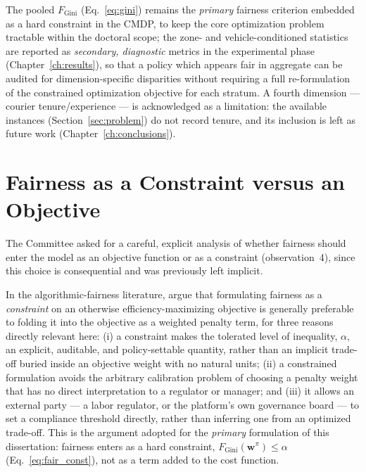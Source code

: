 \documentclass[12pt,a4paper]{report}
\begin{document}
The pooled $F_{\text{Gini}}$ (Eq.~\ref{eq:gini}) remains the \emph{primary} fairness criterion embedded as a hard constraint in the CMDP, to keep the core optimization problem tractable within the doctoral scope; the zone- and vehicle-conditioned statistics are reported as \emph{secondary, diagnostic} metrics in the experimental phase (Chapter~\ref{ch:results}), so that a policy which appears fair in aggregate can be audited for dimension-specific disparities without requiring a full re-formulation of the constrained optimization objective for each stratum. A fourth dimension --- courier tenure/experience --- is acknowledged as a limitation: the available instances (Section~\ref{sec:problem}) do not record tenure, and its inclusion is left as future work (Chapter~\ref{ch:conclusions}).

\section{Fairness as a Constraint versus an Objective}
\label{sec:concept-constraint}

The Committee asked for a careful, explicit analysis of whether fairness should enter the model as an objective function or as a constraint (observation~4), since this choice is consequential and was previously left implicit.

In the algorithmic-fairness literature, \citet{corbettdavies2023measure} argue that formulating fairness as a \emph{constraint} on an otherwise efficiency-maximizing objective is generally preferable to folding it into the objective as a weighted penalty term, for three reasons directly relevant here: (i) a constraint makes the tolerated level of inequality, $\alpha$, an explicit, auditable, and policy-settable quantity, rather than an implicit trade-off buried inside an objective weight with no natural units; (ii) a constrained formulation avoids the arbitrary calibration problem of choosing a penalty weight that has no direct interpretation to a regulator or manager; and (iii) it allows an external party --- a labor regulator, or the platform's own governance board --- to set a compliance threshold directly, rather than inferring one from an optimized trade-off. This is the argument adopted for the \emph{primary} formulation of this dissertation: fairness enters as a hard constraint, $F_{\text{Gini}}(\mathbf{w}^\pi) \leq \alpha$ (Eq.~\ref{eq:fair_const}), not as a term added to the cost function.
\end{document}
